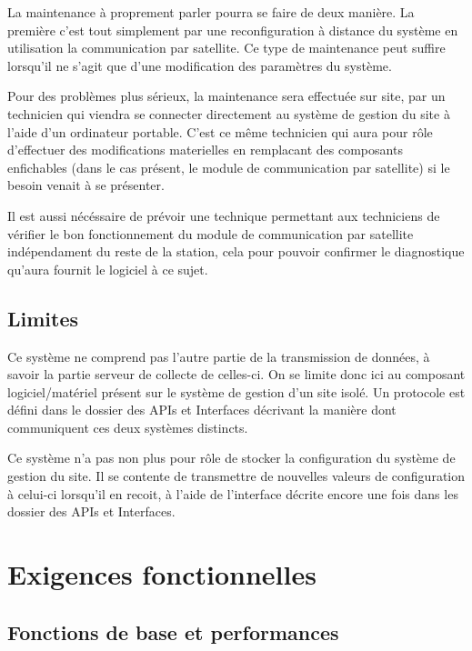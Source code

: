 
La maintenance à proprement parler pourra se faire de deux manière. La première c'est tout simplement par une reconfiguration à distance du système en utilisation la communication par satellite. Ce type de maintenance peut suffire lorsqu'il ne s'agit que d'une modification des paramètres du système.

Pour des problèmes plus sérieux, la maintenance sera effectuée sur site, par un technicien qui viendra se connecter directement au système de gestion du site à l'aide d'un ordinateur portable. C'est ce même technicien qui aura pour rôle d'effectuer des modifications materielles en remplacant des composants enfichables (dans le cas présent, le module de communication par satellite) si le besoin venait à se présenter.

Il est aussi nécéssaire de prévoir une technique permettant aux techniciens de vérifier le bon fonctionnement du module de communication par satellite indépendament du reste de la station, cela pour pouvoir confirmer le diagnostique qu'aura fournit le logiciel à ce sujet.

\subsection{Limites}

Ce système ne comprend pas l'autre partie de la transmission de données, à savoir la partie serveur de collecte de celles-ci. On se limite donc ici au composant logiciel/matériel présent sur le système de gestion d'un site isolé. Un protocole est défini dans le dossier des APIs et Interfaces décrivant la manière dont communiquent ces deux systèmes distincts.

Ce système n'a pas non plus pour rôle de stocker la configuration du système de gestion du site. Il se contente de transmettre de nouvelles valeurs de configuration à celui-ci lorsqu'il en recoit, à l'aide de l'interface décrite encore une fois dans les dossier des APIs et Interfaces.

\section{Exigences fonctionnelles}

\subsection{Fonctions de base et performances}


